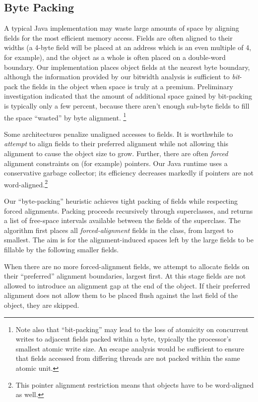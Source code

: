 \documentclass{sig-alt-full}
\begin{document}
\subsection{Byte Packing}
%
A typical Java implementation may waste large amounts of space by
aligning fields for the most efficient memory access.  Fields are
often aligned to their widths (a 4-byte field will be placed at an address
which is an even multiple of 4, for example), and the object as a
whole is often placed on a double-word boundary. Our implementation
places object fields at the nearest byte boundary, although
the information provided by our bitwidth
analysis is sufficient to {\it bit}-pack the fields in the object
when space is truly at a premium.  Preliminary investigation
indicated that the amount of additional space gained by bit-packing 
is typically only a few percent, because there aren't enough sub-byte
fields to fill the space ``wasted'' by byte alignment.%
\footnote{Note also that ``bit-packing'' may lead to the loss of
atomicity on concurrent writes to adjacent fields packed within a byte,
typically the processor's smallest atomic write size.  An escape
analysis would be sufficient to ensure that fields accessed from
differing threads are not packed within the same atomic unit.}

Some architectures penalize unaligned accesses to fields.  It is
worthwhile to {\it attempt} to align fields to their preferred
alignment while not allowing this alignment to cause the object size to grow.
Further, there are often {\it forced} alignment constraints on
(for example) pointers.  Our Java runtime uses a conservative garbage
collector; its efficiency decreases markedly if pointers are not
word-aligned.\footnote{This pointer alignment restriction means that
  objects have to be word-aligned as well.}

Our ``byte-packing'' heuristic achieves
tight packing of fields while respecting forced alignments.  Packing
proceeds recursively through superclasses, and returns a list of
free-space intervals available between the fields of the superclass.
The algorithm first places all {\it forced-alignment} fields in
the class, from largest to smallest.  The aim is for the
alignment-induced spaces left by the large fields to be fillable by
the following smaller fields.

When there are no more forced-alignment fields, we attempt to allocate
fields on their ``preferred'' alignment boundaries, largest first.
At this stage fields are not allowed to introduce an alignment gap at
the end of the object.  If their preferred alignment does not allow
them to be placed flush
against the last field of the object, they are skipped.
\end{document}
